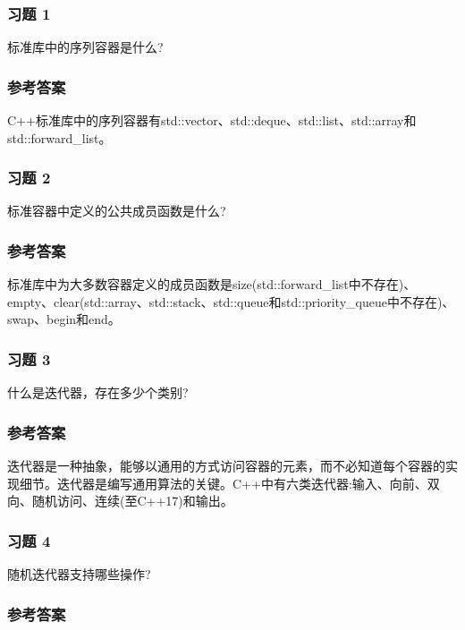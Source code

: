 \subsubsection{习题 1}

标准库中的序列容器是什么?

\subsubsection{参考答案}

C++标准库中的序列容器有std::vector、std::deque、std::list、std::array和std::forward\_list。


\subsubsection{习题 2}

标准容器中定义的公共成员函数是什么?

\subsubsection{参考答案}

标准库中为大多数容器定义的成员函数是size(std::forward\_list中不存在)、empty、clear(std::array、std::stack、std::queue和std::priority\_queue中不存在)、swap、begin和end。

\subsubsection{习题 3}

什么是迭代器，存在多少个类别?

\subsubsection{参考答案}

迭代器是一种抽象，能够以通用的方式访问容器的元素，而不必知道每个容器的实现细节。迭代器是编写通用算法的关键。C++中有六类迭代器:输入、向前、双向、随机访问、连续(至C++17)和输出。

\subsubsection{习题 4}

随机迭代器支持哪些操作?

\subsubsection{参考答案}

